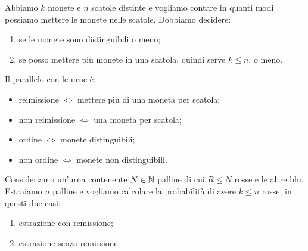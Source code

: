 \documentclass[a4paper]{article}
\begin{document}
Abbiamo \(k\) monete e \(n\) scatole distinte e vogliamo contare
in quanti modi possiamo mettere le monete nelle scatole.
Dobbiamo decidere:
\begin{enumerate}
    \item se le monete sono distinguibili o meno;
    \item se posso mettere più monete in una scatola, quindi serve \(k \leq n\), o meno.
\end{enumerate}
Il parallelo con le urne è:
\begin{itemize}
    \item reimissione \(\iff\) mettere più di una moneta per scatola;
    \item non reimissione \(\iff\) una moneta per scatola;
    \item ordine \(\iff\) monete distinguibili;
    \item non ordine \(\iff\) monete non distinguibili.
\end{itemize}

\begin{snippetexercise}{}
    Consideriamo un'urna contenente \(N \in \mathbb{N}\)
    palline di cui \(R \leq N\) rosse e le altre blu.
    Estraiamo \(n\) palline e vogliamo calcolare la probabilità di avere \(k \leq n\) rosse,
    in questi due casi:
    \begin{enumerate}
        \item estrazione con remissione;
        \item estrazione senza remissione.
    \end{enumerate}
\end{snippetexercise}
\end{document}
